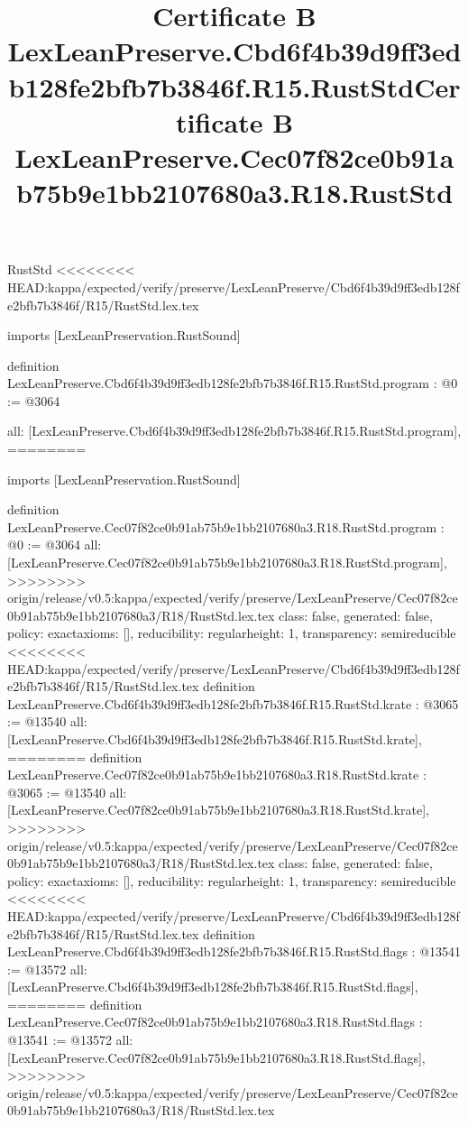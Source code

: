 \begin{lexlean}{RustStd}
<<<<<<<< HEAD:kappa/expected/verify/preserve/LexLeanPreserve/Cbd6f4b39d9ff3edb128fe2bfb7b3846f/R15/RustStd.lex.tex
\title{Certificate B LexLeanPreserve.Cbd6f4b39d9ff3edb128fe2bfb7b3846f.R15.RustStd}
\begin{coremodule}
imports [LexLeanPreservation.RustSound]

definition LexLeanPreserve.Cbd6f4b39d9ff3edb128fe2bfb7b3846f.R15.RustStd.program : @0 := @3064 {
  all: [LexLeanPreserve.Cbd6f4b39d9ff3edb128fe2bfb7b3846f.R15.RustStd.program],
========
\title{Certificate B LexLeanPreserve.Cec07f82ce0b91ab75b9e1bb2107680a3.R18.RustStd}
\begin{coremodule}
imports [LexLeanPreservation.RustSound]

definition LexLeanPreserve.Cec07f82ce0b91ab75b9e1bb2107680a3.R18.RustStd.program : @0 := @3064 {
  all: [LexLeanPreserve.Cec07f82ce0b91ab75b9e1bb2107680a3.R18.RustStd.program],
>>>>>>>> origin/release/v0.5:kappa/expected/verify/preserve/LexLeanPreserve/Cec07f82ce0b91ab75b9e1bb2107680a3/R18/RustStd.lex.tex
  class: false,
  generated: false,
  policy: exact{axioms: []},
  reducibility: regular{height: 1},
  transparency: semireducible
}
<<<<<<<< HEAD:kappa/expected/verify/preserve/LexLeanPreserve/Cbd6f4b39d9ff3edb128fe2bfb7b3846f/R15/RustStd.lex.tex
definition LexLeanPreserve.Cbd6f4b39d9ff3edb128fe2bfb7b3846f.R15.RustStd.krate : @3065 := @13540 {
  all: [LexLeanPreserve.Cbd6f4b39d9ff3edb128fe2bfb7b3846f.R15.RustStd.krate],
========
definition LexLeanPreserve.Cec07f82ce0b91ab75b9e1bb2107680a3.R18.RustStd.krate : @3065 := @13540 {
  all: [LexLeanPreserve.Cec07f82ce0b91ab75b9e1bb2107680a3.R18.RustStd.krate],
>>>>>>>> origin/release/v0.5:kappa/expected/verify/preserve/LexLeanPreserve/Cec07f82ce0b91ab75b9e1bb2107680a3/R18/RustStd.lex.tex
  class: false,
  generated: false,
  policy: exact{axioms: []},
  reducibility: regular{height: 1},
  transparency: semireducible
}
<<<<<<<< HEAD:kappa/expected/verify/preserve/LexLeanPreserve/Cbd6f4b39d9ff3edb128fe2bfb7b3846f/R15/RustStd.lex.tex
definition LexLeanPreserve.Cbd6f4b39d9ff3edb128fe2bfb7b3846f.R15.RustStd.flags : @13541 := @13572 {
  all: [LexLeanPreserve.Cbd6f4b39d9ff3edb128fe2bfb7b3846f.R15.RustStd.flags],
========
definition LexLeanPreserve.Cec07f82ce0b91ab75b9e1bb2107680a3.R18.RustStd.flags : @13541 := @13572 {
  all: [LexLeanPreserve.Cec07f82ce0b91ab75b9e1bb2107680a3.R18.RustStd.flags],
>>>>>>>> origin/release/v0.5:kappa/expected/verify/preserve/LexLeanPreserve/Cec07f82ce0b91ab75b9e1bb2107680a3/R18/RustStd.lex.tex
}}}
\end{coremodule}}
\end{coremodule}
\end{lexlean}
